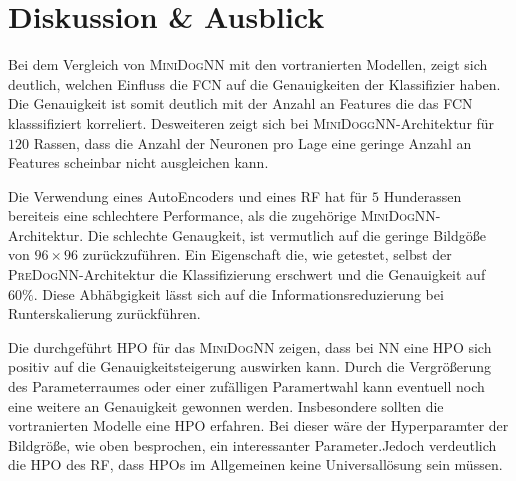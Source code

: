 \section{Diskussion \& Ausblick}
Bei dem Vergleich von \textsc{MiniDogNN} mit den vortranierten Modellen,
zeigt sich deutlich, welchen Einfluss die FCN auf die Genauigkeiten der
Klassifizier haben. Die Genauigkeit ist somit deutlich mit der Anzahl an Features
die das FCN klasssifiziert korreliert. Desweiteren zeigt sich bei \textsc{MiniDoggNN}-Architektur
für $120$ Rassen, dass die Anzahl der Neuronen pro Lage eine geringe Anzahl an
Features scheinbar nicht ausgleichen kann.

Die Verwendung eines AutoEncoders und eines RF hat für $5$ Hunderassen bereiteis
eine schlechtere Performance, als die zugehörige \textsc{MiniDogNN}-Architektur.
Die schlechte Genaugkeit, ist vermutlich auf die geringe Bildgöße von $96\times96$
zurückzuführen. Ein Eigenschaft die, wie getestet, selbst der \textsc{PreDogNN}-Architektur
die Klassifizierung erschwert und die Genauigkeit auf $60\%$. Diese Abhäbgigkeit
lässt sich auf die Informationsreduzierung bei Runterskalierung zurückführen.

Die durchgeführt HPO für das \textsc{MiniDogNN} zeigen, dass bei NN eine HPO
sich positiv auf die Genauigkeitsteigerung auswirken kann. Durch die Vergrößerung
des Parameterraumes oder einer zufälligen Paramertwahl kann eventuell noch eine
weitere an Genauigkeit gewonnen werden. Insbesondere sollten die vortranierten
Modelle eine HPO erfahren. Bei dieser wäre der Hyperparamter der Bildgröße,
wie oben besprochen, ein interessanter Parameter.Jedoch verdeutlich
die HPO des RF, dass HPOs im Allgemeinen keine Universallösung sein müssen.

